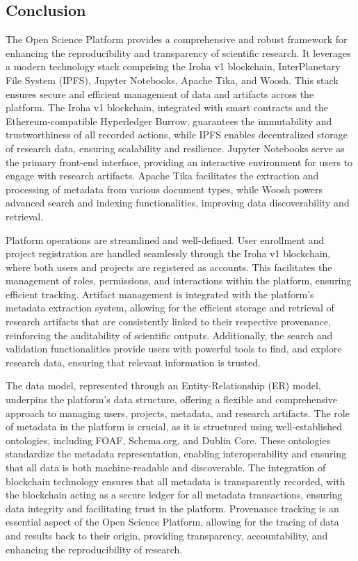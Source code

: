 \documentclass{article}
\begin{document}
\subsection{Conclusion}
The Open Science Platform provides a comprehensive and robust framework for enhancing the reproducibility and transparency of scientific research. It leverages a modern technology stack comprising the Iroha v1 blockchain, InterPlanetary File System (IPFS), Jupyter Notebooks, Apache Tika, and Woosh. This stack ensures secure and efficient management of data and artifacts across the platform. The Iroha v1 blockchain, integrated with smart contracts and the Ethereum-compatible Hyperledger Burrow, guarantees the immutability and trustworthiness of all recorded actions, while IPFS enables decentralized storage of research data, ensuring scalability and resilience. Jupyter Notebooks serve as the primary front-end interface, providing an interactive environment for users to engage with research artifacts. Apache Tika facilitates the extraction and processing of metadata from various document types, while Woosh powers advanced search and indexing functionalities, improving data discoverability and retrieval.

Platform operations are streamlined and well-defined. User enrollment and project registration are handled seamlessly through the Iroha v1 blockchain, where both users and projects are registered as accounts. This facilitates the management of roles, permissions, and interactions within the platform, ensuring efficient tracking. Artifact management is integrated with the platform's metadata extraction system, allowing for the efficient storage and retrieval of research artifacts that are consistently linked to their respective provenance, reinforcing the auditability of scientific outputs. Additionally, the search and validation functionalities provide users with powerful tools to find, and explore research data, ensuring that relevant information is trusted.

The data model, represented through an Entity-Relationship (ER) model, underpins the platform's data structure, offering a flexible and comprehensive approach to managing users, projects, metadata, and research artifacts. The role of metadata in the platform is crucial, as it is structured using well-established ontologies, including FOAF, Schema.org, and Dublin Core. These ontologies standardize the metadata representation, enabling interoperability and ensuring that all data is both machine-readable and discoverable. The integration of blockchain technology ensures that all metadata is transparently recorded, with the blockchain acting as a secure ledger for all metadata transactions, ensuring data integrity and facilitating trust in the platform. Provenance tracking is an essential aspect of the Open Science Platform, allowing for the tracing of data and results back to their origin, providing transparency, accountability, and enhancing the reproducibility of research.
\end{document}

